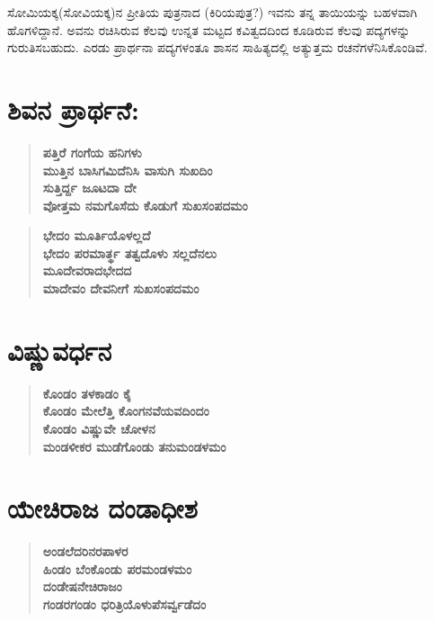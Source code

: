 ಸೋಮಿಯಕ್ಕ(ಸೋವಿಯಕ್ಕ)ನ ಪ್ರೀತಿಯ ಪುತ್ರನಾದ (ಕಿರಿಯಪುತ್ರ?) ಇವನು ತನ್ನ ತಾಯಿಯನ್ನು ಬಹಳವಾಗಿ ಹೊಗಳಿದ್ದಾನೆ. ಅವನು ರಚಿಸಿರುವ ಕೆಲವು ಉನ್ನತ ಮಟ್ಟದ ಕವಿತ್ವದದಿಂದ ಕೂಡಿರುವ ಕೆಲವು ಪದ್ಯಗಳನ್ನು ಗುರುತಿಸಬಹುದು. ಎರಡು ಪ್ರಾರ್ಥನಾ ಪದ್ಯಗಳಂತೂ ಶಾಸನ ಸಾಹಿತ್ಯದಲ್ಲಿ ಅತ್ಯುತ್ತಮ ರಚನೆಗಳೆನಿಸಿಕೊಂಡಿವೆ.

\section*{ಶಿವನ ಪ್ರಾರ್ಥನೆ:}

\begin{verse}
\textbf{ಪತ್ತಿರೆ ಗಂಗೆಯ ಹನಿಗಳು} \\\textbf{ಮುತ್ತಿನ ಬಾಸಿಗಮಿದೆನಿಸಿ ವಾಸುಗಿ ಸುಖದಿಂ} \\\textbf{ಸುತ್ತಿರ್ದ್ದ ಜೂಟದಾ ದೇ} \\\textbf{ವೋತ್ತಮ ನಮಗೊಸೆದು ಕೊಡುಗೆ ಸುಖಸಂಪದಮಂ}
\end{verse}

\begin{verse}
\textbf{ಭೇದಂ ಮೂರ್ತಿಯೊಳಲ್ಲದೆ} \\\textbf{ಭೇದಂ ಪರಮಾರ್ತ್ಥ ತತ್ವದೊಳು ಸಲ್ಲದೆನಲು} \\\textbf{ಮೂದೇವರಾದಭೇದದ} \\\textbf{ಮಾದೇವಂ ದೇವನೀಗೆ ಸುಖಸಂಪದಮಂ}
\end{verse}


\section*{ವಿಷ್ಣುವರ್ಧನ}

\begin{verse}
\textbf{ಕೊಂಡಂ ತಳಕಾಡಂ ಕೈ} \\\textbf{ಕೊಂಡಂ ಮೇಲೆತ್ತಿ ಕೊಂಗನವೆಯವದಿಂದಂ} \\\textbf{ಕೊಂಡಂ ವಿಷ್ಣುವೇ ಚೋಳನ} \\\textbf{ಮಂಡಳೀಕರ ಮುಡೆಗೊಂಡು ತನುಮಂಡಳಮಂ}
\end{verse}


\section*{ಯೇಚಿರಾಜ ದಂಡಾಧೀಶ}

\begin{verse}
\textbf{ಅಂಡಲೆದರಿನರಪಾಳರ} \\\textbf{ಹಿಂಡಂ ಬೆಂಕೊಂಡು ಪರಮಂಡಳಮಂ} \\\textbf{ದಂಡೇಷನೇಚಿರಾಜಂ} \\\textbf{ಗಂಡರಗಂಡಂ ಧರಿತ್ರಿಯೊಳುಪೆಸರ್ವ್ವಡೆದಂ}
\end{verse}


